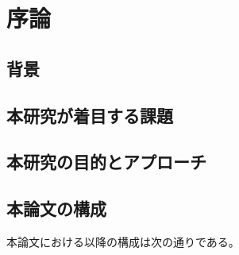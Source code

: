 \chapter{序論}
\label{chap:introduction}

\section{背景}
\label{section:background}

\section{本研究が着目する課題}


\section{本研究の目的とアプローチ}


\section{本論文の構成}

本論文における以降の構成は次の通りである。